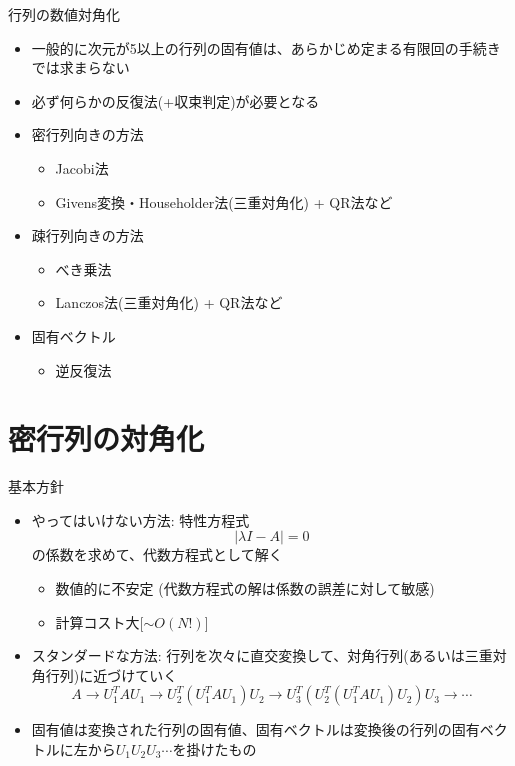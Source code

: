 \documentclass[dvipdfmx]{beamer}
\begin{document}
\begin{frame}[t,fragile]{行列の数値対角化}
  \begin{itemize}
  \item 一般的に次元が5以上の行列の固有値は、あらかじめ定まる有限回の手続きでは求まらない
  \item 必ず何らかの反復法(+収束判定)が必要となる
  \item 密行列向きの方法
    \begin{itemize}
    \item Jacobi法
    \item Givens変換・Householder法(三重対角化) + QR法など
    \end{itemize}
  \item 疎行列向きの方法
    \begin{itemize}
    \item べき乗法
    \item Lanczos法(三重対角化) + QR法など
    \end{itemize}
  \item 固有ベクトル
    \begin{itemize}
    \item 逆反復法
    \end{itemize}
  \end{itemize}
\end{frame}

\section{密行列の対角化}

\begin{frame}[t,fragile]{基本方針}
  \begin{itemize}
  \item やってはいけない方法: 特性方程式
    \[
    |\lambda I - A| = 0
    \]
    の係数を求めて、代数方程式として解く
    \begin{itemize}
    \item 数値的に不安定 (代数方程式の解は係数の誤差に対して敏感)
    \item 計算コスト大[$\sim O(N!)$]
    \end{itemize}
  \item スタンダードな方法: 行列を次々に直交変換して、対角行列(あるいは三重対角行列)に近づけていく
    \[
    A \rightarrow U_1^T A U_1 \rightarrow U_2^T (U_1^T A U_1) U_2 \rightarrow U_3^T (U_2^T (U_1^T A U_1) U_2) U_3 \rightarrow \cdots
    \]
  \item 固有値は変換された行列の固有値、固有ベクトルは変換後の行列の固有ベクトルに左から$U_1 U_2 U_3 \cdots$を掛けたもの
  \end{itemize}
\end{frame}
\end{document}

